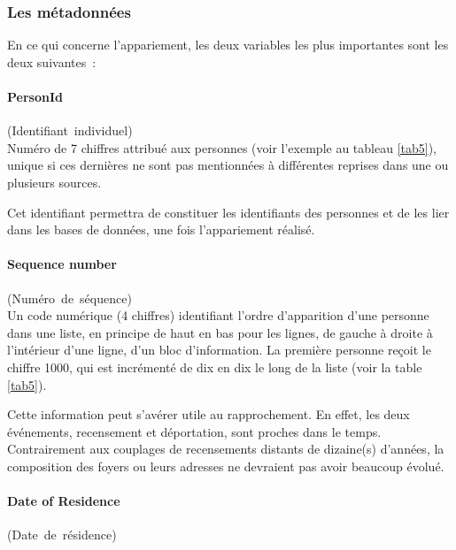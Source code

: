 \documentclass[a4paper,12pt,twoside]{book}
\begin{document}
                \subsubsection{Les métadonnées}
                
                En ce qui concerne l'appariement, les deux variables les plus importantes sont les deux suivantes~:
                
                \paragraph{PersonId}\mbox{(Identifiant individuel)} \\

                Numéro de 7 chiffres attribué aux personnes (voir l'exemple au tableau \ref{tab5}), \og{}unique\fg{} si ces dernières ne sont pas mentionnées à différentes reprises dans une ou plusieurs sources.
                
                Cet identifiant permettra de constituer les identifiants des personnes et de les lier dans les bases de données, une fois l'appariement réalisé.
                \pagebreak
                
                \paragraph{Sequence number}\mbox{(Numéro de séquence)} \\
                
                Un code numérique (4 chiffres) identifiant l'ordre d'apparition d'une personne dans une liste, en principe de haut en bas pour les lignes, de gauche à droite à l'intérieur d'une ligne, d'un bloc d'information. La première personne reçoit le chiffre 1000, qui est incrémenté de dix en dix le long de la liste (voir la table \ref{tab5}).
                
                Cette information peut s'avérer utile au rapprochement. En effet, les deux événements, recensement et déportation, sont proches dans le temps. Contrairement aux couplages de recensements distants de dizaine(s) d'années, la composition des foyers ou leurs adresses ne devraient pas avoir beaucoup évolué.

                \paragraph{Date of Residence}\mbox{(Date de résidence)} \\
                
\end{document}
